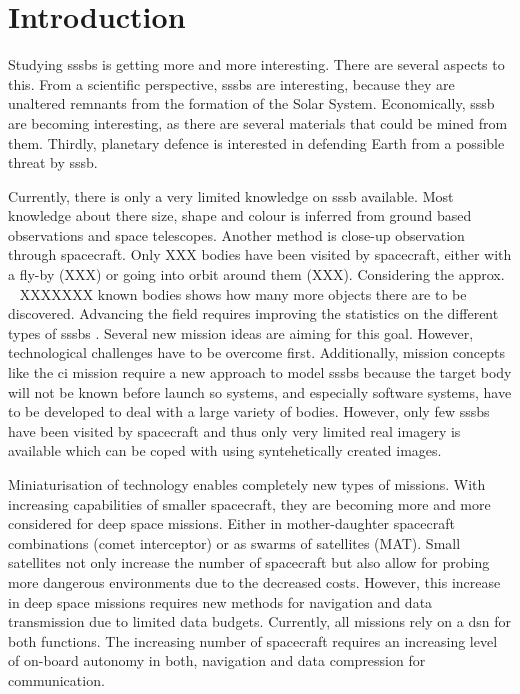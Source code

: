 \section{Introduction}
Studying \gls{sssb}s is getting more and more interesting. There are several aspects to this. From a scientific perspective, \gls{sssb}s are interesting, because they are unaltered remnants from the formation of the Solar System. Economically, \gls{sssb} are becoming interesting, as there are several materials that could be mined from them. Thirdly, planetary defence is interested in defending Earth from a possible threat by \gls{sssb}.

Currently, there is only a very limited knowledge on \gls{sssb} available. Most knowledge about there size, shape and colour is inferred from ground based observations and space telescopes. Another method is close-up observation through spacecraft. Only {\color{red}XXX} bodies have been visited by spacecraft, either with a fly-by {\color{red}(XXX)} or going into orbit around them {\color{red}(XXX)}. Considering the approx. ~{\color{red} XXXXXXX} known bodies shows how many more objects there are to be discovered. Advancing the field requires improving the statistics on the different types of \gls{sssb}s \cite{Pajusalu2019CharacterizationMapping}. Several new mission ideas are aiming for this goal. However, technological challenges have to be overcome first. Additionally, mission concepts like the \gls{ci} mission require a new approach to model \gls{sssb}s because the target body will not be known before launch so systems, and especially software systems, have to be developed to deal with a large variety of bodies. However, only few \gls{sssb}s have been visited by spacecraft and thus only very limited real imagery is available which can be coped with using syntehetically created images.

Miniaturisation of technology enables completely new types of missions. With increasing capabilities of smaller spacecraft, they are becoming more and more considered for deep space missions. Either in mother-daughter spacecraft combinations (comet interceptor) or as swarms of satellites (MAT). Small satellites not only increase the number of spacecraft but also allow for probing more dangerous environments due to the decreased costs. However, this increase in deep space missions requires new methods for navigation and data transmission due to limited data budgets. Currently, all missions rely on a \gls{dsn} for both functions. The increasing number of spacecraft requires an increasing level of on-board autonomy in both, navigation and data compression for communication.

